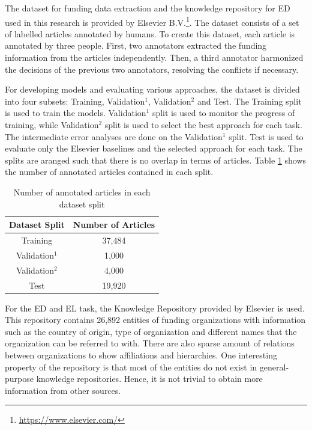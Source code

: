 \documentclass{report}
\theoremstyle{definition}
\theoremstyle{remark}
\begin{document}
The dataset for funding data extraction and the knowledge repository for ED used in this research is provided by Elsevier B.V.\footnote{\url{https://www.elsevier.com/}}. The dataset consists of a set of labelled articles annotated by humans. To create this dataset, each article is annotated by three people. First, two annotators extracted the funding information from the articles independently. Then, a third annotator harmonized the decisions of the previous two annotators, resolving the conflicts if necessary. 

For developing models and evaluating various approaches, the dataset is divided into four subsets: Training, Validation$^{1}$, Validation$^{2}$ and Test. The Training split is used to train the models. Validation$^{1}$ split is used to monitor the progress of training, while Validation$^{2}$ split is used to select the best approach for each task. The intermediate error analyses are done on the Validation$^{1}$ split. Test is used to evaluate only the Elsevier baselines and the selected approach for each task. The splits are aranged such that there is no overlap in terms of articles. Table \ref{tab:goldstats} shows the number of annotated articles contained in each split.

\begin{table}[h!]
    \centering
    \begin{tabular}{c c}
    Dataset Split  & Number of Articles  \\
        \hline
    Training &  37,484\\
    Validation$^1$ & 1,000\\
    Validation$^2$ & 4,000\\
    Test & 19,920 \\
    \end{tabular}
    \caption{Number of annotated articles in each dataset split}
    \label{tab:goldstats}
\end{table}

For the ED and EL task, the Knowledge Repository provided by Elsevier is used. This repository contains 26,892 entities of funding organizations with information such as the country of origin, type of organization and different names that the organization can be referred to with. There are also sparse amount of relations between organizations to show affiliations and hierarchies. One interesting property of the repository is that most of the entities do not exist in general-purpose knowledge repositories. Hence, it is not trivial to obtain more information from other sources.
\end{document}
